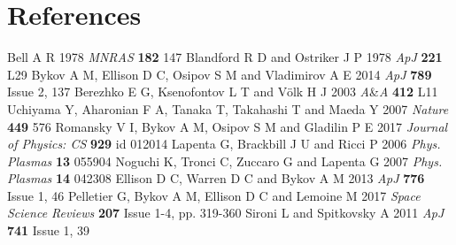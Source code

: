 \documentclass[a4paper]{jpconf}
\begin{document}
\section*{References}
\begin{thebibliography}{20}
	 Bell A R 1978 \textit{MNRAS} \textbf{182} 147
	 Blandford R D and Ostriker J P 1978 \textit{ApJ} \textbf{221} L29 
	 Bykov A M, Ellison D C, Osipov S M and Vladimirov A E 2014 \textit{ApJ} \textbf{789} Issue 2, 137
	 Berezhko E G, Ksenofontov L T and V{\"o}lk H J  2003 \textit{A}{\&}\textit{A} \textbf{412} L11
	 Uchiyama Y, Aharonian F A, Tanaka T, Takahashi T and Maeda Y 2007 \textit{Nature} \textbf{449} 576
	 Romansky V I, Bykov A M, Osipov S M and Gladilin P E 2017 \textit{Journal of Physics: CS} \textbf{929} id 012014 
	 Lapenta G, Brackbill J U and Ricci P 2006 \textit{Phys. Plasmas} \textbf{13} 055904
	 Noguchi K, Tronci C, Zuccaro G and Lapenta G 2007 \textit{Phys. Plasmas} \textbf{14} 042308
	 Ellison D C, Warren D C and Bykov A M 2013 \textit{ApJ} \textbf{776} Issue 1, 46
	 Pelletier G, Bykov A M, Ellison D C and Lemoine M 2017 \textit{Space Science Reviews} \textbf{207} Issue 1-4, pp. 319-360
	 Sironi L and Spitkovsky A 2011 \textit{ApJ} \textbf{741} Issue 1, 39
\end{thebibliography}
\end{document}
